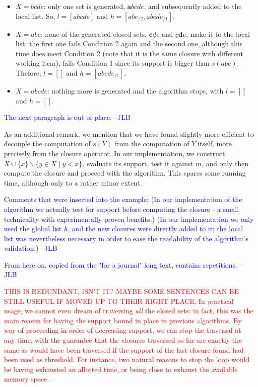 \documentclass{article}
\newcommand{\added}[1]{\textcolor{blue}{#1}}
\newcommand{\deleted}[1]{\textcolor{red}{#1}}
\def\s{\mathit{s}}
\begin{document}
\begin{itemize}
\item $X=bcde$: only one set is generated, 
$\textbf{a}bcde$, and subsequently added to 
the local list. So, $l=[abcde]$ and $h=[abe_{/2}, abcde_{/1}]$.

\item $X=abe$: none of the generated closed sets,
$\textbf{c}\underline{d}e$ and $\underline{c}\textbf{d}e$, 
make it to the local list: the first one fails Condition 2
again and the second one, although this time does meet 
Condition 2 (note that it is the same closure with 
different working item), fails Condition 1 since its 
support is bigger than $\s(abe)$. Thefore, $l=[]$ and 
$h=[abcde_{/1}]$.

\item $X=abcde$: nothing more is generated and the 
algorithm stops, with $l=[]$ and $h=[]$.
\end{itemize}


\added{The next paragraph is out of place. --JLB}

As an additional remark, we mention that we have found slightly more
efficient to decouple the computation of $s(Y)$ from the computation 
of $Y$ itself, more precisely from the closure operator. In our
implementation, we construct $X \cup \{x\} \backslash \{y \in X \mid y < x\}$,
evaluate its support, test it against $m$, and only then compute the
closure and proceed with the algorithm. This spares some running time,
although only to a rather minor extent. 

\added{Comments that were inserted into the example:
(In our implementation of the algorithm we actually test for support before computing the closure - a small technicality with experimentally proven benefits.)
(In our implementation we only used the global list $h$, and the new closures were directly added to it; the  local list was nevertheless necessary in order to ease the readability of the algorithm's validation.)
--JLB}

\added{From here on, copied from the "for a journal" 
long text, contains repetitions. --JLB}

\deleted{THIS IS REDUNDANT, ISN'T IT? MAYBE SOME SENTENCES
CAN BE STILL USEFUL IF MOVED UP TO THEIR RIGHT PLACE.
In practical usage, we cannot even dream of traversing \emph{all} 
the closed sets: in fact, this was the main reason for having the
support bound in place in previous algorithms. 
By way of proceeding in order of 
decreasing support, we can stop the traversal at any time, with the
guarantee that the closures traversed so far are exactly the same
as would have been traversed if the support of the last
closure found had been used as threshold. For instance,
two natural reasons to stop the loop would be having exhausted
an allotted time, or being close to exhaust the available memory space.}
\end{document}
